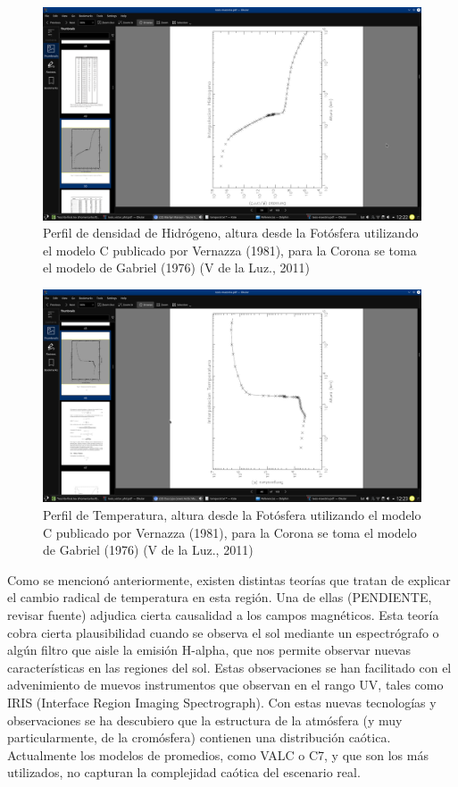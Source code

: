 \documentclass[9pt]{book}
\begin{document}
\begin{figure}[h]
\centering
\includegraphics[scale=.8]{densidad}
\caption{ Perfil de densidad de Hidr\'ogeno, altura desde la Fot\'osfera utilizando el modelo C publicado por Vernazza (1981), para la Corona se toma el modelo de Gabriel (1976) (V de la Luz., 2011) }
\label{d_cromosfera}
\end{figure}

\begin{figure}[h]
\centering
\includegraphics[scale=.8]{Temperatura}
\caption{ Perfil de Temperatura, altura desde la Fot\'osfera utilizando el modelo C publicado por Vernazza (1981), para la Corona se toma el modelo de Gabriel (1976) (V de la Luz., 2011) }
\label{t_cromosfera}
\end{figure}


Como se mencion\'o anteriormente, existen distintas teor\'ias que tratan de explicar el cambio radical de temperatura en esta regi\'on. Una de ellas (PENDIENTE, revisar fuente) adjudica cierta causalidad a los campos magn\'eticos. Esta teor\'ia cobra cierta plausibilidad cuando se observa el sol mediante un espectr\'ografo o alg\'un filtro que aisle la emisi\'on H-alpha, que nos permite observar nuevas caracter\'isticas en las regiones del sol. Estas observaciones se han facilitado con el advenimiento de muevos instrumentos que observan en el rango UV, tales como IRIS (Interface Region Imaging Spectrograph). Con estas nuevas tecnolog\'ias y observaciones se ha descubiero que la estructura de la atm\'osfera (y muy particularmente, de la crom\'osfera) contienen una distribuci\'on ca\'otica. Actualmente los modelos de promedios, como VALC o C7, y que son los m\'as utilizados, no capturan la complejidad ca\'otica del escenario real.
\end{document}
